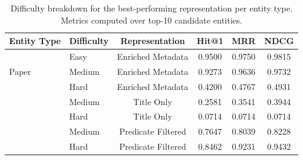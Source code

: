 \begin{table}[ht]
  \centering
  \small
  \caption{Difficulty breakdown for the best-performing representation per entity type. Metrics computed over top-10 candidate entities.}
  \label{tab:pre_retrieval_difficulty}
  \begin{tabular}{llcccc}
    \toprule
    \textbf{Entity Type} & \textbf{Difficulty} & \textbf{Representation} & \textbf{Hit@1} & \textbf{MRR} & \textbf{NDCG} \\
    \midrule
    \multirow{3}{*}{Paper} & Easy & Enriched Metadata & 0.9500 & 0.9750 & 0.9815 \\
     & Medium & Enriched Metadata & 0.9273 & 0.9636 & 0.9732 \\
     & Hard & Enriched Metadata & 0.4200 & 0.4767 & 0.4931 \\
    \addlinespace
    \multirow{2}{*}{Dataset} & Medium & Title Only & 0.2581 & 0.3541 & 0.3944 \\
     & Hard & Title Only & 0.0714 & 0.0714 & 0.0714 \\
    \addlinespace
    \multirow{2}{*}{Model} & Medium & Predicate Filtered & 0.7647 & 0.8039 & 0.8228 \\
     & Hard & Predicate Filtered & 0.8462 & 0.9231 & 0.9432 \\
    \bottomrule
  \end{tabular}
\end{table}